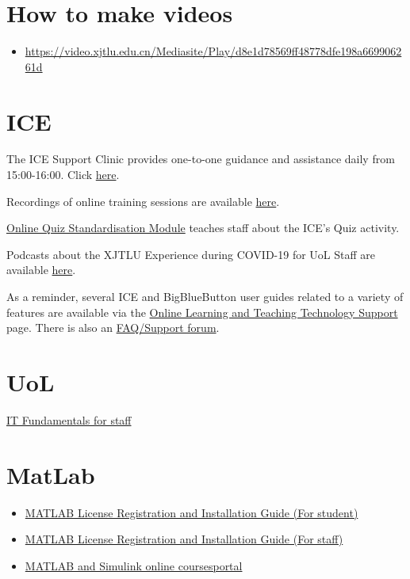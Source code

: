 \documentclass[
]{book}
\providecommand{\tightlist}{%
  \setlength{\itemsep}{0pt}\setlength{\parskip}{0pt}}
\newenvironment{rmdblock}[1]
  {\begin{shaded*}
  \begin{itemize}
  \renewcommand{\labelitemi}{
    \raisebox{-.7\height}[0pt][0pt]{
      {\setkeys{Gin}{width=2em,keepaspectratio}\texttt{[image: image/\#1]}}
    }
  }
  \item
  }
  {
  \end{itemize}
  \end{shaded*}
  }
\newenvironment{rmdvd}
  {\begin{rmdblock}{vd}}
  {\end{rmdblock}}
\begin{document}
\hypertarget{how-to-make-videos}{%
\section{How to make videos}\label{how-to-make-videos}}

\begin{rmdvd}
\url{https://video.xjtlu.edu.cn/Mediasite/Play/d8e1d78569ff48778dfe198a669906261d}
\end{rmdvd}

\hypertarget{ice}{%
\section{ICE}\label{ice}}

The ICE Support Clinic provides one-to-one guidance and assistance daily from 15:00-16:00. Click \href{https://ice.xjtlu.edu.cn/mod/page/view.php?id=142089}{here}.

Recordings of online training sessions are available \href{https://ice.xjtlu.edu.cn/mod/glossary/view.php?id=128625}{here}.

\href{https://ice.xjtlu.edu.cn/course/view.php?id=1631}{Online Quiz Standardisation Module} teaches staff about the ICE's Quiz activity.

Podcasts about the XJTLU Experience during COVID-19 for UoL Staff are available \href{https://connect.xjtlu.edu.cn/view/view.php?t=kD90XzHKFxeqnty1Ppvc}{here}.

As a reminder, several ICE and BigBlueButton user guides related to a variety of features are available via the \href{https://ice.xjtlu.edu.cn/course/view.php?id=1605}{Online Learning and Teaching Technology Support} page. There is also an \href{https://ice.xjtlu.edu.cn/course/view.php?id=1605\&section=17}{FAQ/Support forum}.

\hypertarget{uol}{%
\section{UoL}\label{uol}}

\href{https://www.liverpool.ac.uk/csd/fundamentals/}{IT Fundamentals for staff}

\hypertarget{matlab}{%
\section{MatLab}\label{matlab}}

\begin{itemize}
\tightlist
\item
  \href{https://guide.xjtlu.edu.cn/how-to-register-and-install-matlab-license-for-student.html}{MATLAB License Registration and Installation Guide (For student)}
\item
  \href{https://guide.xjtlu.edu.cn/how-to-register-and-install-matlab-license-for-staff.html}{MATLAB License Registration and Installation Guide (For staff)}
\item
  \href{https://matlabacademy.mathworks.co}{MATLAB and Simulink online coursesportal}
\end{itemize}
\end{document}

